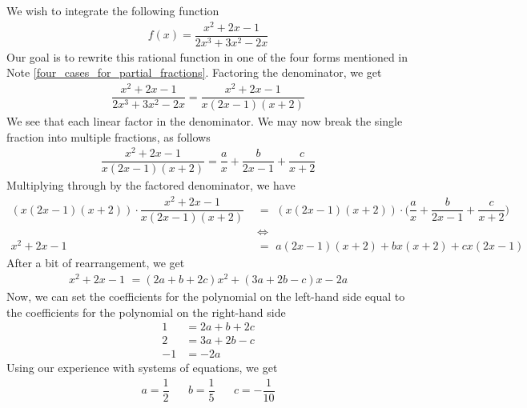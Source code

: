 \begin{example}
We wish to integrate the following function
\begin{align*}
    f(x) = \dfrac{x^{2} + 2x - 1}{2x^{3} + 3x^{2} - 2x}
\end{align*}
Our goal is to rewrite this rational function in one of the four forms mentioned in Note \ref{four_cases_for_partial_fractions}. Factoring the denominator, we get
\begin{align*}
    \dfrac{x^{2} + 2x - 1}{2x^{3} + 3x^{2} - 2x} = \dfrac{x^{2} + 2x - 1}{x(2x - 1)(x + 2)}
\end{align*}
We see that each linear factor in the denominator. We may now break the single fraction into multiple fractions, as follows
\begin{align*}
    \dfrac{x^{2} + 2x - 1}{x(2x - 1)(x + 2)} = \dfrac{a}{x} + \dfrac{b}{2x - 1} + \dfrac{c}{x + 2}
\end{align*}
Multiplying through by the factored denominator, we have
\begin{align*}
    (x(2x - 1)(x + 2)) \cdot \dfrac{x^{2} + 2x - 1}{x(2x - 1)(x + 2)} \hspace{4pt} &= \hspace{4pt} (x(2x - 1)(x + 2)) \cdot \Big(\dfrac{a}{x} + \dfrac{b}{2x - 1} + \dfrac{c}{x + 2} \Big)\\[2ex]
    &\Longleftrightarrow\\[2ex]
    x^{2} + 2x - 1 \hspace{4pt} &= \hspace{4pt} a(2x - 1)(x + 2) + bx(x + 2) + cx(2x - 1)
\end{align*}
After a bit of rearrangement, we get
\begin{align*}
    x^{2} + 2x - 1 \hspace{4pt} = (2a + b + 2c)x^{2} + (3a + 2b - c)x - 2a
\end{align*}
Now, we can set the coefficients for the polynomial on the left-hand side equal to the coefficients for the polynomial on the right-hand side
\begin{align*}
    1 &= 2a + b + 2c\\[2ex]
    2 &= 3a + 2b - c\\[2ex]
    -1 &= -2a
\end{align*}
Using our experience with systems of equations, we get
\begin{align*}
    a = \dfrac{1}{2} \hspace{20pt} b = \dfrac{1}{5} \hspace{20pt} c = -\dfrac{1}{10}

\end{align*}
\end{example}
